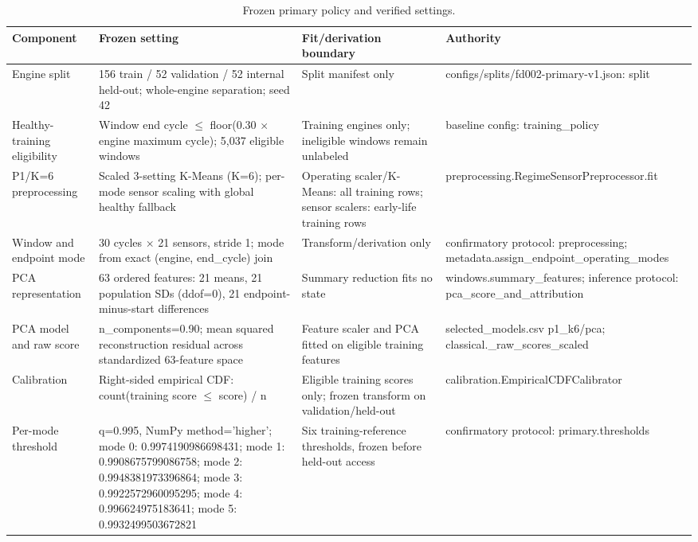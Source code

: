\begin{table}[t]
\centering
\small
\caption{Frozen primary policy and verified settings.}
\label{tab:frozen-policy}
\begin{tabular}{p{}p{}p{}p{}}
\hline
Component & Frozen setting & Fit/derivation boundary & Authority \\
\hline
Engine split & 156 train / 52 validation / 52 internal held-out; whole-engine separation; seed 42 & Split manifest only & configs/splits/fd002-primary-v1.json: split \\
Healthy-training eligibility & Window end cycle $\leq$ floor(0.30 $\times$ engine maximum cycle); 5,037 eligible windows & Training engines only; ineligible windows remain unlabeled & baseline config: training\_policy \\
P1/K=6 preprocessing & Scaled 3-setting K-Means (K=6); per-mode sensor scaling with global healthy fallback & Operating scaler/K-Means: all training rows; sensor scalers: early-life training rows & preprocessing.RegimeSensorPreprocessor.fit \\
Window and endpoint mode & 30 cycles $\times$ 21 sensors, stride 1; mode from exact (engine, end\_cycle) join & Transform/derivation only & confirmatory protocol: preprocessing; metadata.assign\_endpoint\_operating\_modes \\
PCA representation & 63 ordered features: 21 means, 21 population SDs (ddof=0), 21 endpoint-minus-start differences & Summary reduction fits no state & windows.summary\_features; inference protocol: pca\_score\_and\_attribution \\
PCA model and raw score & n\_components=0.90; mean squared reconstruction residual across standardized 63-feature space & Feature scaler and PCA fitted on eligible training features & selected\_models.csv p1\_k6/pca; classical.\_raw\_scores\_scaled \\
Calibration & Right-sided empirical CDF: count(training score $\leq$ score) / n & Eligible training scores only; frozen transform on validation/held-out & calibration.EmpiricalCDFCalibrator \\
Per-mode threshold & q=0.995, NumPy method='higher'; mode 0: 0.9974190986698431; mode 1: 0.9908675799086758; mode 2: 0.9948381973396864; mode 3: 0.9922572960095295; mode 4: 0.996624975183641; mode 5: 0.9932499503672821 & Six training-reference thresholds, frozen before held-out access & confirmatory protocol: primary.thresholds \\

\end{tabular}
\end{table}
